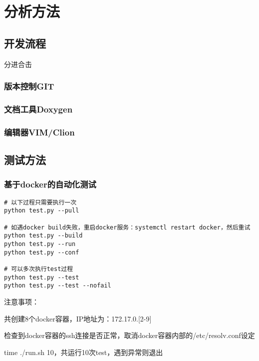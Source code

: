 \chapter{分析方法}

\section{开发流程}

分进合击

\subsection{版本控制GIT}

\subsection{文档工具Doxygen}

\subsection{编辑器VIM/Clion}

\section{测试方法}

\subsection{基于docker的自动化测试}

\begin{lstlisting}
# 以下过程只需要执行一次
python test.py --pull

# 如遇docker build失败，重启docker服务：systemctl restart docker，然后重试
python test.py --build
python test.py --run
python test.py --conf

# 可以多次执行test过程
python test.py --test
python test.py --test --nofail
\end{lstlisting}

注意事项：
\begin{compactenum}
\item 共创建8个docker容器，IP地址为：172.17.0.[2-9]
\item 检查到docker容器的ssh连接是否正常，取消docker容器内部的/etc/resolv.conf设定
\item time ./run.sh 10，共运行10次test，遇到异常则退出
\end{compactenum}

